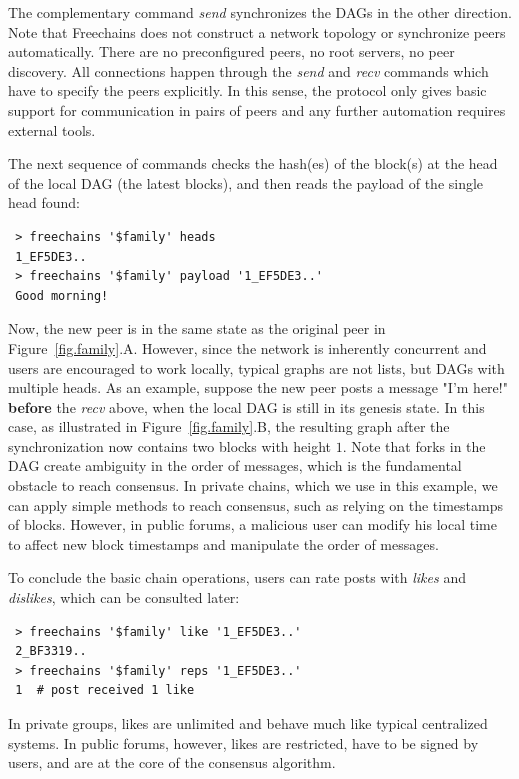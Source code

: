 \documentclass[10pt,journal,compsoc]{IEEEtran}
\newcommand{\FC}       {Freechains\xspace}
\begin{document}
The complementary command \emph{send} synchronizes the DAGs in the other
direction.
Note that \FC does not construct a network topology or synchronize peers
automatically.
There are no preconfigured peers, no root servers, no peer discovery.
All connections happen through the \emph{send} and \emph{recv} commands which
have to specify the peers explicitly.
In this sense, the protocol only gives basic support for communication in pairs
of peers and any further automation requires external tools.

The next sequence of commands checks the hash(es) of the block(s) at the head
of the local DAG (the latest blocks), and then reads the payload of the single
head found:

{\footnotesize
\begin{verbatim}
 > freechains '$family' heads
 1_EF5DE3..
 > freechains '$family' payload '1_EF5DE3..'
 Good morning!
\end{verbatim}
}

Now, the new peer is in the same state as the original peer in
Figure~\ref{fig.family}.A.
However, since the network is inherently concurrent and users are encouraged to
work locally, typical graphs are not lists, but DAGs with multiple heads.
As an example, suppose the new peer posts a message "I'm here!" \textbf{before}
the \emph{recv} above, when the local DAG is still in its genesis state.
In this case, as illustrated in Figure~\ref{fig.family}.B, the resulting graph
after the synchronization now contains two blocks with height $1$.
%
Note that forks in the DAG create ambiguity in the order of messages, which is
the fundamental obstacle to reach consensus.
In private chains, which we use in this example, we can apply simple methods to
reach consensus, such as relying on the timestamps of blocks.
However, in public forums, a malicious user can modify his local time to affect
new block timestamps and manipulate the order of messages.

To conclude the basic chain operations, users can rate posts with \emph{likes}
and \emph{dislikes}, which can be consulted later:

{\footnotesize
\begin{verbatim}
 > freechains '$family' like '1_EF5DE3..'
 2_BF3319..
 > freechains '$family' reps '1_EF5DE3..'
 1  # post received 1 like
\end{verbatim}
}

In private groups, likes are unlimited and behave much like typical centralized
systems.
In public forums, however, likes are restricted, have to be signed by users,
and are at the core of the consensus algorithm.
\end{document}

